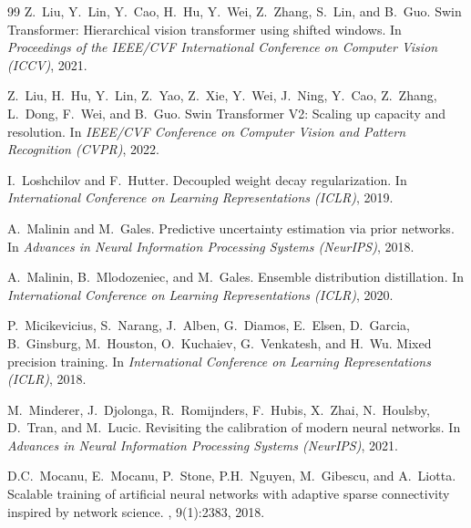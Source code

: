 \documentclass[letterpaper]{article} %
\begin{document}
\begin{thebibliography}{99}
Z.~Liu, Y.~Lin, Y.~Cao, H.~Hu, Y.~Wei, Z.~Zhang, S.~Lin, and B.~Guo.
\newblock Swin Transformer: Hierarchical vision transformer using shifted windows.
\newblock In {\em Proceedings of the IEEE/CVF International Conference on Computer Vision (ICCV)}, 2021.

Z.~Liu, H.~Hu, Y.~Lin, Z.~Yao, Z.~Xie, Y.~Wei, J.~Ning, Y.~Cao, Z.~Zhang, L.~Dong, F.~Wei, and B.~Guo.
\newblock Swin Transformer V2: Scaling up capacity and resolution.
\newblock In {\em IEEE/CVF Conference on Computer Vision and Pattern Recognition (CVPR)}, 2022.

I.~Loshchilov and F.~Hutter.
\newblock Decoupled weight decay regularization.
\newblock In {\em International Conference on Learning Representations (ICLR)}, 2019.

A.~Malinin and M.~Gales.
\newblock Predictive uncertainty estimation via prior networks.
\newblock In {\em Advances in Neural Information Processing Systems (NeurIPS)}, 2018.

A.~Malinin, B.~Mlodozeniec, and M.~Gales.
\newblock Ensemble distribution distillation.
\newblock In {\em International Conference on Learning Representations (ICLR)}, 2020.

P.~Micikevicius, S.~Narang, J.~Alben, G.~Diamos, E.~Elsen, D.~Garcia, B.~Ginsburg, M.~Houston, O.~Kuchaiev, G.~Venkatesh, and H.~Wu.
\newblock Mixed precision training.
\newblock In {\em International Conference on Learning Representations (ICLR)}, 2018.

M.~Minderer, J.~Djolonga, R.~Romijnders, F.~Hubis, X.~Zhai, N.~Houlsby, D.~Tran, and M.~Lucic.
\newblock Revisiting the calibration of modern neural networks.
\newblock In {\em Advances in Neural Information Processing Systems (NeurIPS)}, 2021.

D.C.~Mocanu, E.~Mocanu, P.~Stone, P.H.~Nguyen, M.~Gibescu, and A.~Liotta.
\newblock Scalable training of artificial neural networks with adaptive sparse connectivity inspired by network science.
, 9(1):2383, 2018.


\end{thebibliography}
\end{document}
